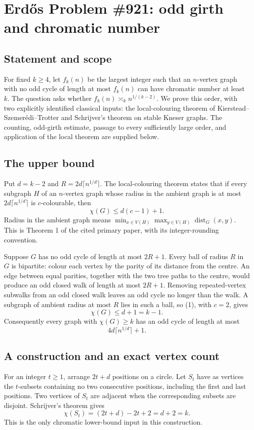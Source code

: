 \section*{Erd\H{o}s Problem \#921: odd girth and chromatic number}
\subsection*{Statement and scope}
For fixed \(k\geq4\), let \(f_k(n)\) be the largest integer such that an \(n\)-vertex graph with no odd cycle of length at most \(f_k(n)\) can have chromatic number at least \(k\). The question asks whether \(f_k(n)\asymp_k n^{1/(k-2)}\).
We prove this order, with two explicitly identified classical inputs: the local-colouring theorem of Kierstead--Szemer\'edi--Trotter and Schrijver's theorem on stable Kneser graphs. The counting, odd-girth estimate, passage to every sufficiently large order, and application of the local theorem are supplied below.

\subsection*{The upper bound}
Put \(d=k-2\) and \(R=2d\lceil n^{1/d}\rceil\).
The local-colouring theorem states that if every subgraph \(H\) of an \(n\)-vertex graph whose radius in the ambient graph is at most \(2d\lceil n^{1/d}\rceil\) is \(c\)-colourable, then
\[
 \chi(G)\leq d(c-1)+1. \tag{1}
\]
Radius in the ambient graph means
\(\min_{x\in V(H)}\max_{y\in V(H)}\operatorname{dist}_G(x,y)\).
This is Theorem 1 of the cited primary paper, with its integer-rounding convention.

Suppose \(G\) has no odd cycle of length at most \(2R+1\).
Every ball of radius \(R\) in \(G\) is bipartite: colour each vertex by the parity of its distance from the centre. An edge between equal parities, together with the two tree paths to the centre, would produce an odd closed walk of length at most \(2R+1\). Removing repeated-vertex subwalks from an odd closed walk leaves an odd cycle no longer than the walk.
A subgraph of ambient radius at most \(R\) lies in such a ball, so (1), with \(c=2\), gives
\[
 \chi(G)\leq d+1=k-1.
\]
Consequently every graph with \(\chi(G)\geq k\) has an odd cycle of length at most
\[
 4d\lceil n^{1/d}\rceil+1. \tag{2}
\]

\subsection*{A construction and an exact vertex count}
For an integer \(t\geq1\), arrange \(2t+d\) positions on a circle. Let \(S_t\) have as vertices the \(t\)-subsets containing no two consecutive positions, including the first and last positions. Two vertices of \(S_t\) are adjacent when the corresponding subsets are disjoint.
Schrijver's theorem gives
\[
 \chi(S_t)=(2t+d)-2t+2=d+2=k. \tag{3}
\]
This is the only chromatic lower-bound input in this construction.

